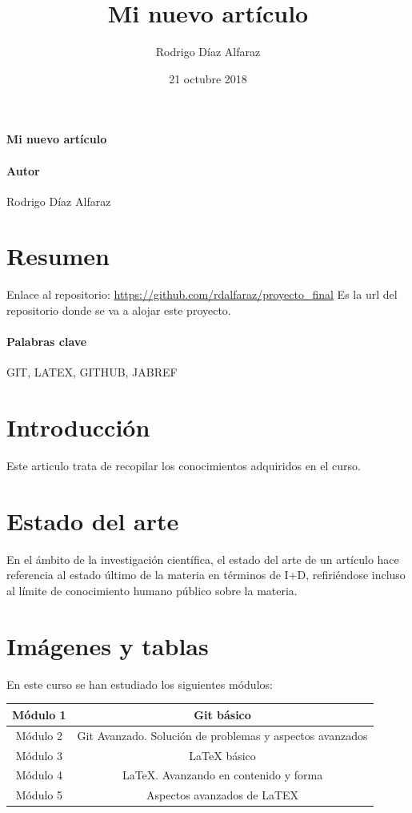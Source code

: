\documentclass[a4paper,11pt]{article}
\begin{document}
\title{Mi nuevo artículo} 
\author{Rodrigo Díaz Alfaraz}
\date{21 octubre 2018}
\maketitle

\paragraph*{Mi nuevo artículo}

\paragraph*{Autor}
Rodrigo Díaz Alfaraz

\section*{Resumen} 
Enlace al repositorio:
\url{https://github.com/rdalfaraz/proyecto_final} Es la url del repositorio donde se va a alojar este proyecto.
\paragraph*{Palabras clave}

GIT, LATEX, GITHUB, JABREF

\section*{Introducción}
Este articulo trata de recopilar los conocimientos adquiridos en el curso. 

\section*{Estado del arte}
En el ámbito de la investigación científica, el estado del arte de un artículo hace referencia al estado último de la materia en términos de I+D, refiriéndose incluso al límite de conocimiento humano público sobre la materia.

\section*{Imágenes y tablas}
En este curso se han estudiado los siguientes módulos:

\begin{table}
\centering
\begin{tabular}{|c|c|}
\hline
Módulo 1 & Git básico \\
\hline
Módulo 2 & Git Avanzado. Solución de problemas y aspectos avanzados \\
\hline
Módulo 3 & LaTeX básico \\
\hline
Módulo 4 & LaTeX. Avanzando en contenido y forma \\
\hline
Módulo 5 & Aspectos avanzados de LaTEX \\
\hline
\end{tabular}
\end{table}
\end{document}
